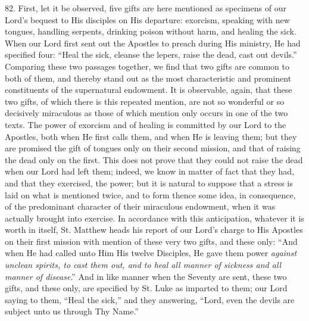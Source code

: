 82.
First, let it be observed, five gifts are here mentioned as specimens
of our Lord's bequest to His disciples on His departure: exorcism,
speaking with new tongues, handling serpents, drinking poison without
harm, and healing the sick. When our Lord first sent out the Apostles
to preach during His ministry, He had specified four: ``Heal the sick,
cleanse the lepers, raise the dead, cast out devils.'' Comparing these
two passages together, we find that two gifts are common to both of
them, and thereby stand out as the most characteristic and prominent
constituents of the supernatural endowment. It is observable, again,
that these two gifts, of which there is this repeated mention, are not
so wonderful or so decisively miraculous as those of which mention
only occurs in one of the two texts. The power of exorcism and of
healing is committed by our Lord to the Apostles, both when He first
calls them, and when He is leaving them; but they are promised the
gift of tongues only on their second mission, and that of raising the
dead only on the first. This does not prove that they could not raise
the dead when our Lord had left them; indeed, we know in matter of
fact that they had, and that they exercised, the power; but it is
natural to suppose that a stress is laid on what is mentioned
twice, and to form thence some idea, in consequence, of the
predominant character of their miraculous endowment, when it was
actually brought into exercise. In accordance with this anticipation,
whatever it is worth in itself, St. Matthew heads his report of our
Lord's charge to His Apostles on their first mission with mention of
these very two gifts, and these only: ``And when He had called unto Him
His twelve Disciples, He gave them power \emph{against unclean spirits,
to cast them out, and to heal all manner of sickness and all manner of
disease}.'' And in like manner when the Seventy are sent, these two
gifts, and these only, are specified by St. Luke as imparted to them;
our Lord saying to them, ``Heal the sick,'' and they answering, ``Lord,
even the devils are subject unto us through Thy Name.''

